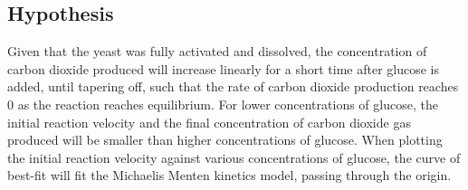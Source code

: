 \documentclass{article}
\begin{document}
\subsection{Hypothesis}
Given that the yeast was fully activated and dissolved, the concentration of carbon dioxide produced will increase linearly for a short time after glucose is added, until tapering off, such that the rate of carbon dioxide production reaches 0 as the reaction reaches equilibrium. For lower concentrations of glucose, the initial reaction velocity and the final concentration of carbon dioxide gas produced will be smaller than higher concentrations of glucose. When plotting the initial reaction velocity against various concentrations of glucose, the curve of best-fit will fit the Michaelis Menten kinetics model, passing through the origin.

\newpage

\end{document}
